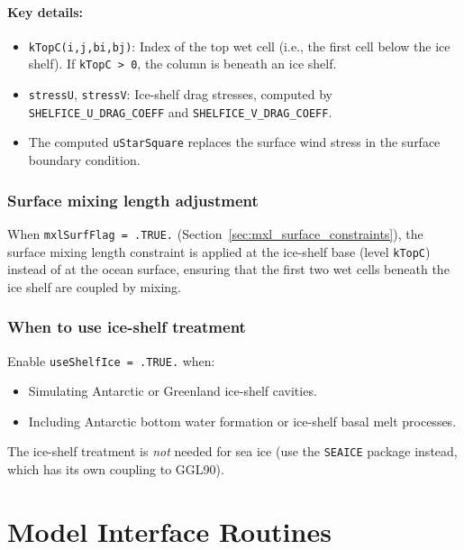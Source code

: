 \documentclass[12pt,letterpaper]{article}
\begin{document}
\paragraph{Key details:}
\begin{itemize}
\item \verb|kTopC(i,j,bi,bj)|: Index of the top wet cell (i.e., the first cell below the ice shelf). If \verb|kTopC > 0|, the column is beneath an ice shelf.
\item \verb|stressU|, \verb|stressV|: Ice-shelf drag stresses, computed by \verb|SHELFICE_U_DRAG_COEFF| and \verb|SHELFICE_V_DRAG_COEFF|.
\item The computed \verb|uStarSquare| replaces the surface wind stress in the surface boundary condition.
\end{itemize}

\subsubsection{Surface mixing length adjustment}

When \verb|mxlSurfFlag = .TRUE.| (Section~\ref{sec:mxl_surface_constraints}), the surface mixing length constraint is applied at the ice-shelf base (level \verb|kTopC|) instead of at the ocean surface, ensuring that the first two wet cells beneath the ice shelf are coupled by mixing.

\subsubsection{When to use ice-shelf treatment}

Enable \verb|useShelfIce = .TRUE.| when:
\begin{itemize}
\item Simulating Antarctic or Greenland ice-shelf cavities.
\item Including Antarctic bottom water formation or ice-shelf basal melt processes.
\end{itemize}

The ice-shelf treatment is \emph{not} needed for sea ice (use the \verb|SEAICE| package instead, which has its own coupling to GGL90).

\section{Model Interface Routines}
\label{sec:model_interface}
\end{document}

